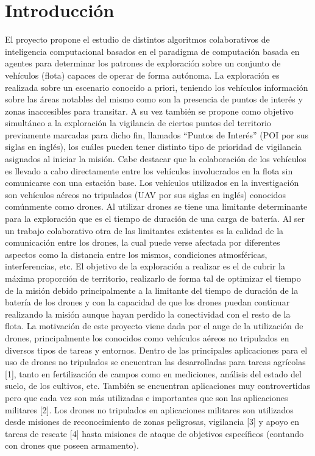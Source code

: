\chapter{Introducción}

El proyecto propone el estudio de distintos algoritmos colaborativos de inteligencia computacional basados en el paradigma de computación basada en agentes para determinar los patrones de exploración sobre un conjunto de vehículos (flota) capaces de operar de forma autónoma. La exploración es realizada sobre un escenario conocido a priori, teniendo los vehículos información sobre las áreas notables del mismo como son la presencia de puntos de interés y zonas inaccesibles para transitar. A su vez también se propone como objetivo simultáneo a la exploración la vigilancia de ciertos puntos del territorio previamente marcadas para dicho fin, llamados “Puntos de Interés” (POI por sus siglas en inglés), los cuáles pueden tener distinto tipo de prioridad de vigilancia asignados al iniciar la misión. Cabe destacar que la colaboración de los vehículos es llevado a cabo directamente entre los vehículos involucrados en la flota sin comunicarse con una estación base. Los vehículos utilizados en la investigación son vehículos aéreos no tripulados (UAV por sus siglas en inglés) conocidos comúnmente como drones. Al utilizar drones se tiene una limitante determinante para la exploración que es el tiempo de duración de una carga de batería. Al ser un trabajo colaborativo otra de las limitantes existentes es la calidad de la comunicación entre los drones, la cual puede verse afectada por diferentes aspectos como la distancia entre los mismos, condiciones atmosféricas, interferencias, etc. El objetivo de la exploración a realizar es el de cubrir la máxima proporción de territorio, realizarlo de forma tal de optimizar el tiempo de la misión debido principalmente a la limitante del tiempo de duración de la batería de los drones y con la capacidad de que los drones puedan continuar realizando la misión aunque hayan perdido la conectividad con el resto de la flota.
La motivación de este proyecto viene dada por el auge de la utilización de drones, principalmente los conocidos como vehículos aéreos no tripulados en diversos tipos de tareas y entornos. Dentro de las principales aplicaciones para el uso de drones no tripulados se encuentran las desarrolladas para tareas agrícolas [1], tanto en fertilización de campos como en mediciones, análisis del estado del suelo, de los cultivos, etc. También se encuentran aplicaciones muy controvertidas pero que cada vez son más utilizadas e importantes que son las aplicaciones militares [2]. Los drones no tripulados en aplicaciones militares son utilizados desde misiones de reconocimiento de zonas peligrosas, vigilancia [3] y apoyo en tareas de rescate  [4] hasta misiones de ataque de objetivos específicos (contando con drones que poseen armamento). 
